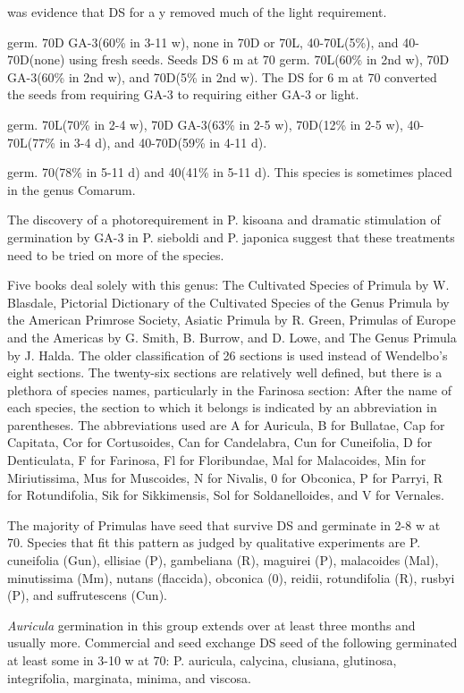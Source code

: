 \begin{description}
was evidence that DS for a y removed much of the light requirement.
\item[P. recta] germ. 70D GA-3(60\% in 3-11 w), none in 70D or 70L, 40-70L(5\%), and
40-70D(none) using fresh seeds. Seeds DS 6 m at 70 germ. 70L(60\% in 2nd w), 70D
GA-3(60\% in 2nd w), and 70D(5\% in 2nd w). The DS for 6 m at 70 converted the
seeds from requiring GA-3 to requiring either GA-3 or light.
\item[P. rupestris] germ. 70L(70\% in 2-4 w), 70D GA-3(63\% in 2-5 w), 70D(12\% in 2-5
w), 40-70L(77\% in 3-4 d), and 40-70D(59\% in 4-11 d).
\item[P. salesoviana] germ. 70(78\% in 5-11 d) and 40(41\% in 5-11 d). This species is
sometimes placed in the genus Comarum.

\item[Primula (Primulaceae)] The discovery of a photorequirement in P. kisoana
and dramatic stimulation of germination by GA-3 in P. sieboldi and P. japonica suggest
that these treatments need to be tried on more of the species.

Five books deal solely with this genus: The Cultivated Species of Primula by W.
Blasdale, Pictorial Dictionary of the Cultivated Species of the Genus Primula by the
American Primrose Society, Asiatic Primula by R. Green, Primulas of Europe and the
Americas by G. Smith, B. Burrow, and D. Lowe, and The Genus Primula by J. Halda.
The older classification of 26 sections is used instead of Wendelbo's eight sections.
The twenty-six sections are relatively well defined, but there is a plethora of species
names, particularly in the Farinosa section: After the name of each species, the
section to which it belongs is indicated by an abbreviation in parentheses. The
abbreviations used are A for Auricula, B for Bullatae, Cap for Capitata, Cor for
Cortusoides, Can for Candelabra, Cun for Cuneifolia, D for Denticulata, F for Farinosa,
Fl for Floribundae, Mal for Malacoides, Min for Miriutissima, Mus for Muscoides, N for
Nivalis, 0 for Obconica, P for Parryi, R for Rotundifolia, Sik for Sikkimensis, Sol for
Soldanelloides, and V for Vernales.

The majority of Primulas have seed that survive DS and germinate in 2-8 w at
70. Species that fit this pattern as judged by qualitative experiments are P. cuneifolia
(Gun), ellisiae (P), gambeliana (R), maguirei (P), malacoides (Mal), minutissima (Mm),
nutans (flaccida), obconica (0), reidii, rotundifolia (R), rusbyi (P), and suffrutescens
(Cun).

\textit{Auricula} germination in this group extends over at least three months and
usually more. Commercial and seed exchange DS seed of the following germinated
at least some in 3-10 w at 70: P. auricula, calycina, clusiana, glutinosa, integrifolia,
marginata, minima, and viscosa.


\end{description}
